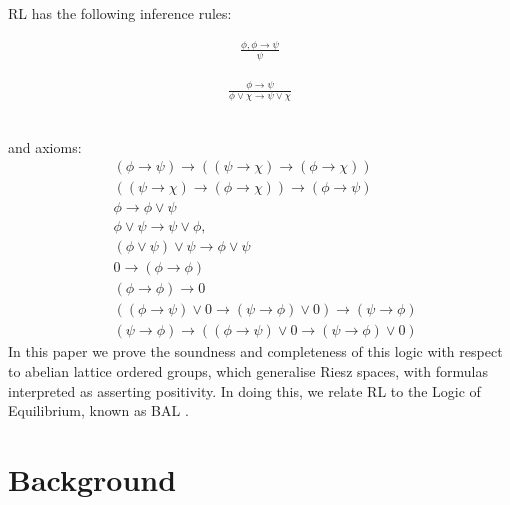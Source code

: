 \documentclass[journal,draftcls,onecolumn]{IEEEtran}
\theoremstyle{definition}
\begin{document}
RL has the following inference rules:\\
\begin{minipage}{0.49\columnwidth}
\begin{gather}
  \tag{MP} \frac{\phi, \phi \rightarrow \psi}{\psi}
\end{gather}
\end{minipage}
\begin{minipage}{0.49\columnwidth}
\begin{gather}
  \tag{RI} \frac{\phi \rightarrow \psi}{\phi \lor \chi \rightarrow \psi \lor \chi}
\end{gather}
\end{minipage}
\vspace{0.3cm}\\
and axioms:
\begin{align}
  \tag{R1a} &(\phi \rightarrow \psi) \rightarrow ((\psi \rightarrow \chi)
  \rightarrow (\phi \rightarrow \chi))\\
  \tag{R1b} &((\psi \rightarrow \chi) \rightarrow (\phi \rightarrow
  \chi)) \rightarrow (\phi \rightarrow \psi)\\
  \tag{R2} &\phi \rightarrow \phi \lor \psi\\
  \tag{R3} &\phi \lor \psi \rightarrow \psi \lor \phi,\\
  \tag{R4} &(\phi \lor \psi)\lor \psi \rightarrow \phi \lor \psi\\
  \tag{R5a} &0 \rightarrow (\phi \rightarrow \phi)\\
  \tag{R5b} &(\phi \rightarrow\phi) \rightarrow 0\\
  \tag{R6a} &((\phi \rightarrow \psi)\lor 0 \rightarrow (\psi \rightarrow \phi) \lor 0) \rightarrow (\psi \rightarrow \phi)\\
  \tag{R6b} & (\psi \rightarrow \phi) \rightarrow ((\phi \rightarrow \psi)\lor 0 \rightarrow (\psi \rightarrow \phi) \lor 0)
\end{align}
In this paper we prove the soundness and completeness of this logic
with respect to abelian lattice ordered groups, which generalise Riesz
spaces, with formulas interpreted as asserting positivity. In doing
this, we relate RL to the Logic of Equilibrium, known as BAL
\cite{Galli:04}.


\section{Background}
\end{document}
